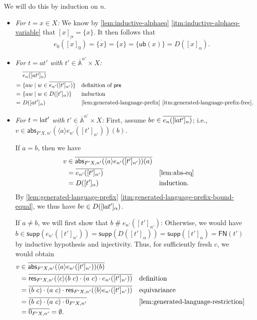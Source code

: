 \documentclass[11pt,a4paper]{amsart}
\newcommand{\pre}{\mathsf{pre}}
\newcommand{\abs}{\mathsf{abs}}
\newcommand{\res}{\mathsf{res}}
\newcommand{\FN}{\mathsf{FN}}
\newcommand{\Names}{\mathbb{A}}
\newcommand{\barNames}{\overline{\Names}}
\newcommand{\fresh}{\mathbin{\#}}
\newcommand{\supp}{\mathsf{supp}}
\newcommand{\bind}[1]{\langle #1\rangle}
\theoremstyle{plain}
\newcommand{\midmid}{\hspace{0.2ex}{\rule[-0.1ex]{0.6pt}{1.65ex}}\hspace{0.2ex}}
\newcommand{\newletter}[1]{{\midmid}#1}
\newcommand{\ub}{\mathsf{ub}}
\numberwithin{equation}{section}
\newcommand{\+}[1]{\mathcal{#1}\xspace}
\theoremstyle{definition}
\begin{document}
We will do this by induction on \(n\).
\begin{itemize}
  \item \emph{For \(t = x \in X\):}
    We know by \cref{lem:inductive-alphaeq} \eqref{itm:inductive-alphaeq-variable} that \([x]_\alpha = \{x\}\).
    It then follows that
    \begin{equation*}
      \overline{e_0([x]_0)} = \overline{\{x\}} = \{x\} = \{\ub(x)\} = D([x]_\alpha).
    \end{equation*}
  \item \emph{For \(t = at'\) with \(t' \in \barNames^{n'} \times X\):}
    \begin{align*}
      &\overline{e_n([at']_n)} \\
      =~&\{aw \mid w \in \overline{e_{n'}([t']_{n'})}\} && \text{definition of } \pre \\
      =~&\{aw \mid w \in D([t']_\alpha)\} && \text{induction} \\
      =~&D([at']_\alpha) && \text{\cref{lem:generated-language-prefix} \eqref{itm:generated-language-prefix-free}}.
    \end{align*}
  \item \emph{For \(t = \newletter{a}t'\) with \(t' \in \barNames^{n'} \times X\):}
    First, assume \(bv \in \overline{e_n([\newletter{a}t']_n)}\); i.e., \(v \in \overline{\abs_{F'X, n'}(\bind{a} e_{n'}([t']_{n'}))(b)}\).

    If \(a = b\), then we have
    \begin{align*}
      v &\in \overline{\abs_{F'X, n'}(\bind{a} e_{n'}([t']_{n'}))(a)} \\
      &= \overline{e_{n'}([t']_{n'})} && \text{\cref{lem:abs-eq}} \\
      &= D([t']_\alpha) && \text{induction}.
    \end{align*}
    By \cref{lem:generated-language-prefix} \eqref{itm:generated-language-prefix-bound-equal}, we thus have \(bv \in D([\newletter{a}t']_\alpha)\).

    If \(a \neq b\), we will first show that \(b \fresh e_{n'}([t']_{n'})\):
    Otherwise, we would have \(b \in \supp(e_{n'}([t']_{n'})) = \supp(D([t']_\alpha)) = \supp([t']_\alpha) = \FN(t')\) by inductive hypothesis and injectivity.
    Thus, for sufficiently fresh \(c\), we would obtain
    \begin{align*}
      v &\in \overline{\abs_{F'X, n'}(\bind{a} e_{n'}([t']_{n'}))(b)} \\
      &= \overline{\res_{F' X, n'}(\bind{c} (b\ c) \cdot (a\ c) \cdot e_{n'}([t']_{n'}))} && \text{definition} \\
      &= \overline{(b\ c) \cdot (a\ c) \cdot \res_{F' X, n'}(\bind{b} e_{n'}([t']_{n'}))} && \text{equivariance} \\
      &= \overline{(b\ c) \cdot (a\ c) \cdot 0_{F'X, n'}} && \text{\cref{lem:generated-language-restriction}} \\
      &= \overline{0_{F'X, n'}} = \emptyset.
    \end{align*}


\end{itemize}
\end{document}
